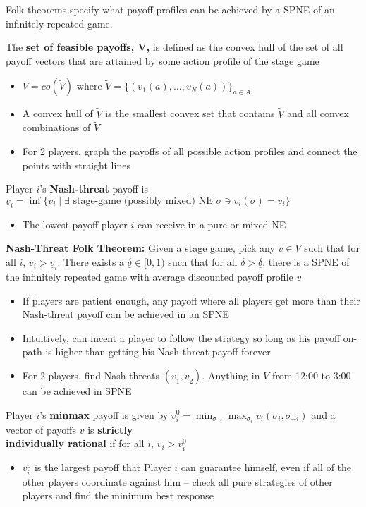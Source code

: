 \documentclass{report}
\begin{document}
Folk theorems specify what payoff profiles can be achieved by a SPNE of an infinitely repeated game. \bigskip

The \textbf{set of feasible payoffs, V,} is defined as the convex hull of the set of all payoff vectors that are attained by some action profile of the stage game
\begin{itemize}
	\item $V = co(\widetilde{V})$ where $\widetilde{V} = \{ (v_1(a),\dots,v_N(a)) \}_{a \in A}$
	\item A convex hull of $\widetilde{V}$ is the smallest convex set that contains $\widetilde{V}$ and all convex combinations of $\widetilde{V}$
	\item For 2 players, graph the payoffs of all possible action profiles and connect the points with straight lines 
\end{itemize} \bigskip

Player $i$'s \textbf{Nash-threat} payoff is $\underline{v}_i = \inf \{ v_i \mid \exists \text{ stage-game (possibly mixed) NE } \sigma \ni v_i(\sigma) = v_i \}$
\begin{itemize}
	\item The lowest payoff player $i$ can receive in a pure or mixed NE
\end{itemize} \bigskip

\textbf{Nash-Threat Folk Theorem:} Given a stage game, pick any $v \in V$ such that for all $i$, $v_i > \underline{v}_i$. There exists a $\underline{\delta} \in [0,1)$ such that for all $\delta > \underline{\delta}$, there is a SPNE of the infinitely repeated game with average discounted payoff profile $v$
\begin{itemize}
	\item If players are patient enough, any payoff where all players get more than their Nash-threat payoff can be achieved in an SPNE
	\item Intuitively, can incent a player to follow the strategy so long as his payoff on-path is higher than getting his Nash-threat payoff forever
	\item For 2 players, find Nash-threats $(\underline{v}_1, \underline{v}_2)$. Anything in $V$ from 12:00 to 3:00 can be achieved in SPNE
\end{itemize} \bigskip

Player $i$'s \textbf{minmax} payoff is given by $v_i^0 = \displaystyle\min_{\sigma_{-i}} \displaystyle\max_{\sigma_i} v_i (\sigma_i,\sigma_{-i})$ and a vector of payoffs $v$ is \textbf{strictly\\ individually rational} if for all $i$, $v_i > v_i^0$
\begin{itemize}
	\item $v_i^0$ is the largest payoff that Player $i$ can guarantee himself, even if all of the other players coordinate against him -- check all pure strategies of other players and find the minimum best response
\end{itemize} \bigskip
\end{document}
